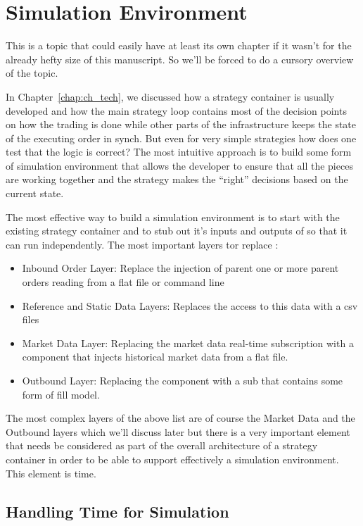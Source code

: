 \section{Simulation Environment}

This is a topic that could easily have at least its own chapter if it wasn't for the already hefty size of this manuscript. So we'll be forced to do a cursory overview of the topic.

In Chapter~\ref{chap:ch_tech}, we discussed how a strategy container is usually developed and how the main strategy loop contains most of the decision points on how the trading is done while other parts of the infrastructure keeps the state of the executing order in synch. But even for very simple strategies how does one test that the logic is correct? The most intuitive approach is to build some form of simulation environment that allows the developer to ensure that all the pieces are working together and the strategy makes the ``right'' decisions based on the current state. 


The most effective way to build a simulation environment is to start with the existing strategy container and to stub out  it's inputs and outputs of so that it can run independently.  The most important layers tor replace :
\begin{itemize}
\item Inbound Order Layer: Replace the injection of parent one or more parent orders reading from a flat file or command line
\item Reference and Static Data Layers: Replaces the access to this data with a csv files
\item Market Data Layer: Replacing the market data real-time subscription with a component that injects historical market data from a flat file.
\item Outbound Layer: Replacing the component with a sub that contains some form of fill model.
\end{itemize}

The most complex layers of the above list are of course the Market Data and the Outbound layers which we'll discuss later but there is a very important element that needs  be considered as part of the overall architecture of a strategy container in order to be able to support effectively a simulation environment. This element is time.



\subsection{Handling Time for Simulation}

